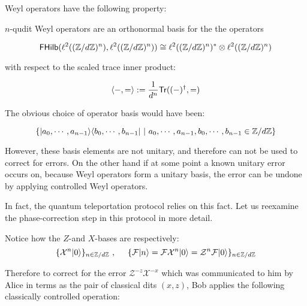 Weyl operators have the following property:

\begin{lemma}
\label{lem:ueb}
$n$-qudit Weyl operators are an orthonormal basis for the the operators

$$
\mathsf{FHilb}(\ell^2((\mathbb{Z}/d\mathbb{Z})^n), \ell^2((\mathbb{Z}/d\mathbb{Z})^n))
\cong \ell^2((\mathbb{Z}/d\mathbb{Z})^n)^*\otimes \ell^2((\mathbb{Z}/d\mathbb{Z})^n)
$$

with respect to the scaled trace inner product:

$$
\langle  -,= \rangle
:=
\dfrac{1}{d^n}\mathsf{Tr}((-)^\dag,=)
$$
\end{lemma}


The obvious choice of operator basis would have been:

$$
\{ |a_0, \cdots, a_{n-1} \rangle \langle  b_0,\cdots, b_{n-1} | \ | \ a_0,\cdots, a_{n-1},b_0,\cdots, b_{n-1} \in \mathbb{Z}/d\mathbb{Z} \}
$$

However, these basis elements are not unitary, and therefore can not be used to correct for errors.
On the other hand if at some point a known unitary error occurs on,  because Weyl operators form a unitary basis, the error can be undone by applying controlled Weyl operators.

In fact, the quantum teleportation protocol relies on this fact.
Let us reexamine the phase-correction step in this protocol in more detail.

Notice how the $Z$-and $X$-bases are respectively: 
$$\{ \mathcal{X}^n|0\rangle \}_{n\in \Z/d\Z}
\ , \hspace{,5cm} \{\mathcal{F}|n\rangle=\mathcal{F} \mathcal{X}^n |0\rangle =\mathcal{Z}^n \mathcal{F} |0\rangle\}_{n\in \Z/d\Z}$$


Therefore to correct for the error $\mathcal{Z}^{-z}\mathcal{X}^{-x}$ which was communicated to him by Alice in terms as the pair of classical dits $(x,z)$,  Bob applies the following classically controlled operation:

